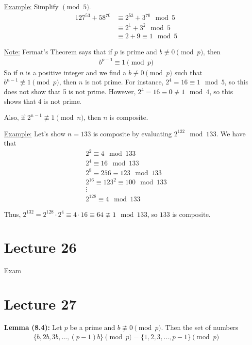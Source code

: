 \documentclass{article}
\begin{document}
\underline{Example:} Simplify $\pmod 5$. \begin{align*}
    127^{53}+58^{70}&\equiv 2^{53}+3^{70}\mod 5\\
    &\equiv 2^1+3^2\mod 5\\
    &\equiv 2+9\equiv 1\mod 5
\end{align*}

\underline{Note:} Fermat's Theorem says that if $p$ is prime and $b\not\equiv 0\pmod p$, then \begin{align*}
    b^{p-1}\equiv 1\pmod p
\end{align*} So if $n$ is a positive integer and we find a $b\not\equiv 0\pmod p$ such that $b^{n-1}\not\equiv 1\pmod p$, then $n$ is not prime. For instance, $2^4=16\equiv 1\mod 5$, so this does not show that 5 is not prime. However, $2^4=16\equiv 0\not\equiv 1\mod 4$, so this shows that 4 is not prime.

Also, if $2^{n-1}\not\equiv 1\pmod n$, then $n$ is composite. 

\underline{Example:} Let's show $n=133$ is composite by evaluating $2^{132}\mod 133$. We have that \begin{align*}
    2^2\equiv 4\mod 133\\
    2^4\equiv 16\mod 133\\
    2^8\equiv 256\equiv 123\mod 133\\
    2^{16}\equiv 123^2\equiv 100\mod 133\\
    \vdots \\
    2^{128}\equiv 4\mod 133
\end{align*}

Thus, $2^{132}=2^{128}\cdot 2^4\equiv 4\cdot 16\equiv 64\not\equiv 1\mod 133$, so $133$ is composite.

\section{Lecture 26}

Exam

\section{Lecture 27}

\textbf{Lemma (8.4):} Let $p$ be a prime and $b\not \equiv 0\pmod p$. Then the set of numbers \begin{align*}
    \{b, 2b, 3b, \dots, (p-1)b\}\pmod p =\{1, 2, 3, \dots, p-1\}\pmod p
\end{align*}
\end{document}
